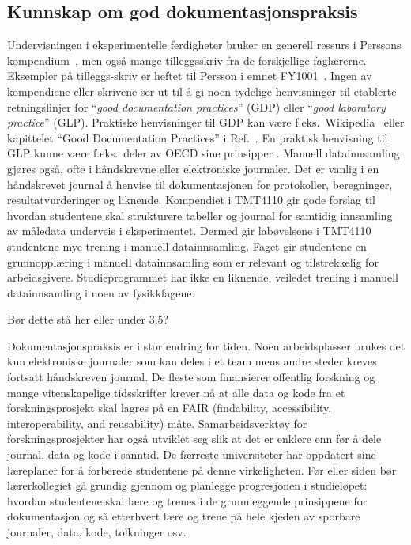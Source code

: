 \documentclass{article}
\begin{document}
\subsection{Kunnskap om god dokumentasjonspraksis}
Undervisningen i eksperimentelle ferdigheter bruker en generell ressurs i Perssons kompendium~\cite{Persson2020}, men også mange tilleggsskriv fra de forskjellige faglærerne. Eksempler på tilleggs-skriv er heftet til Persson i emnet FY1001~\cite{Persson2020FY1001}. Ingen av kompendiene eller skrivene ser ut til å gi noen tydelige henvisninger til etablerte retningslinjer for ``\emph{good documentation practices}'' (GDP) eller ``\emph{good laboratory practice}'' (GLP). Praktiske henvisninger til GDP kan være f.eks.~Wikipedia~\cite{WikiGDP} eller kapittelet ``Good Documentation Practices'' i Ref.~\cite{Davani2017}. En praktisk henvisning til GLP kunne være f.eks.~deler av OECD sine prinsipper \cite{OECD1997}.
Manuell datainnsamling gjøres også, ofte i håndskrevne eller elektroniske journaler. Det er vanlig i en håndskrevet journal å henvise til dokumentasjonen for protokoller, beregninger, resultatvurderinger og liknende. Kompendiet i TMT4110 gir gode forslag til hvordan studentene skal strukturere tabeller og journal for samtidig innsamling av måledata underveis i eksperimentet. Dermed gir labøvelsene i TMT4110 studentene mye trening i manuell datainnsamling. Faget gir studentene en grunnopplæring i manuell datainnsamling som er relevant og tilstrekkelig for arbeidsgivere. Studieprogrammet har ikke en liknende, veiledet trening i manuell datainnsamling i noen av fysikkfagene.

{\color{blue} Bør dette stå her eller under 3.5?

Dokumentasjonspraksis er i stor endring for tiden. Noen arbeidsplasser brukes det kun elektroniske journaler som kan deles i et team mens andre steder kreves fortsatt håndskreven journal. De fleste som finansierer offentlig forskning og mange vitenskapelige tidsskrifter krever nå at alle data og kode fra et forskningsprosjekt skal lagres på en FAIR (findability, accessibility, interoperability, and reusability) måte. Samarbeidsverktøy for forskningsprosjekter har også utviklet seg slik at det er enklere enn før å dele journal, data og kode i sanntid. De færreste universiteter har oppdatert sine læreplaner for å forberede studentene på denne virkeligheten. Før eller siden bør lærerkollegiet gå grundig gjennom og planlegge progresjonen i studieløpet: hvordan studentene skal lære og trenes i de grunnleggende prinsippene for dokumentasjon og så etterhvert lære og trene på hele kjeden av sporbare journaler, data, kode, tolkninger osv.
}
\end{document}
